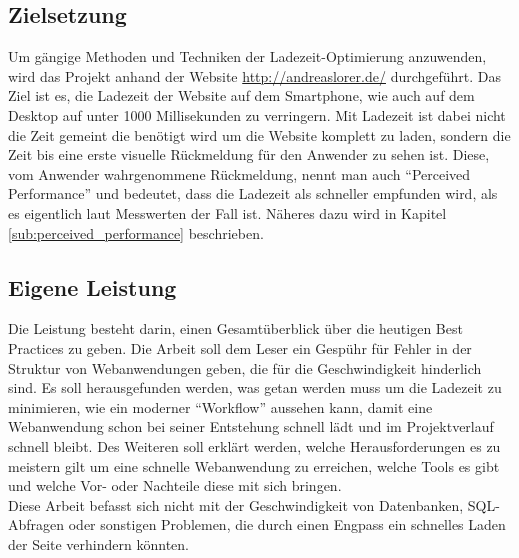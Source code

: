 


	\subsection{Zielsetzung} %
	\label{sub:zielsetzung}
		Um gängige Methoden und Techniken der Ladezeit-Optimierung anzuwenden, wird das Projekt anhand der Website \url{http://andreaslorer.de/} durchgeführt. Das Ziel ist es, die Ladezeit der Website auf dem Smartphone, wie auch auf dem Desktop auf unter 1000 Millisekunden zu verringern. Mit Ladezeit ist dabei nicht die Zeit gemeint die benötigt wird um die Website komplett zu laden, sondern die Zeit bis eine erste visuelle Rückmeldung für den Anwender zu sehen ist. Diese, vom Anwender wahrgenommene Rückmeldung, nennt man auch "`Perceived Performance"' und bedeutet, dass die Ladezeit als schneller empfunden wird, als es eigentlich laut Messwerten der Fall ist. Näheres dazu wird in Kapitel \ref{sub:perceived_performance} beschrieben.\\




	\subsection{Eigene Leistung} %
	\label{sub:eigene_leistung}
		Die Leistung besteht darin, einen Gesamtüberblick über die heutigen Best Practices zu geben. Die Arbeit soll dem Leser ein Gespühr für Fehler in der Struktur von Webanwendungen geben, die für die Geschwindigkeit hinderlich sind.
		Es soll herausgefunden werden, was getan werden muss um die Ladezeit zu minimieren, wie ein moderner "`Workflow"' aussehen kann, damit eine Webanwendung schon bei seiner Entstehung schnell lädt und im Projektverlauf schnell bleibt. Des Weiteren soll erklärt werden, welche Herausforderungen es zu meistern gilt um eine schnelle Webanwendung zu erreichen, welche Tools es gibt und welche Vor- oder Nachteile diese mit sich bringen.\\
		Diese Arbeit befasst sich nicht mit der Geschwindigkeit von Datenbanken, SQL-Abfragen oder sonstigen Problemen, die durch einen Engpass ein schnelles Laden der Seite verhindern könnten.




